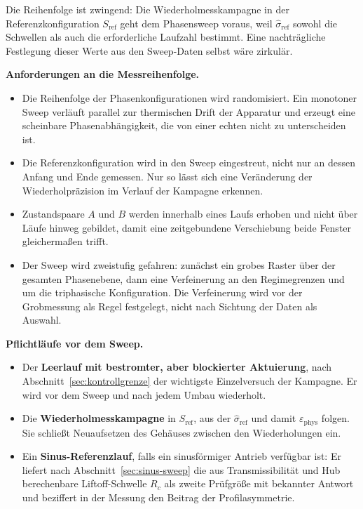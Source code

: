 \documentclass[12pt,a4paper]{report}
\begin{document}
Die Reihenfolge ist zwingend: Die Wiederholmesskampagne in der
Referenzkonfiguration $S_{\mathrm{ref}}$ geht dem Phasensweep voraus,
weil $\hat{\sigma}_{\mathrm{ref}}$ sowohl die Schwellen als auch die
erforderliche Laufzahl bestimmt. Eine nachträgliche Festlegung dieser
Werte aus den Sweep-Daten selbst wäre zirkulär.

\vspace{0.5em}

\textbf{Anforderungen an die Messreihenfolge.}

\begin{itemize}
    \item Die Reihenfolge der Phasenkonfigurationen wird randomisiert.
    Ein monotoner Sweep verläuft parallel zur thermischen Drift der
    Apparatur und erzeugt eine scheinbare Phasenabhängigkeit, die von
    einer echten nicht zu unterscheiden ist.
    \item Die Referenzkonfiguration wird in den Sweep eingestreut, nicht
    nur an dessen Anfang und Ende gemessen. Nur so lässt sich eine
    Veränderung der Wiederholpräzision im Verlauf der Kampagne erkennen.
    \item Zustandspaare $A$ und $B$ werden innerhalb eines Laufs erhoben
    und nicht über Läufe hinweg gebildet, damit eine zeitgebundene
    Verschiebung beide Fenster gleichermaßen trifft.
    \item Der Sweep wird zweistufig gefahren: zunächst ein grobes Raster
    über der gesamten Phasenebene, dann eine Verfeinerung an den
    Regimegrenzen und um die triphasische Konfiguration. Die Verfeinerung
    wird vor der Grobmessung als Regel festgelegt, nicht nach Sichtung
    der Daten als Auswahl.
\end{itemize}

\vspace{0.5em}

\textbf{Pflichtläufe vor dem Sweep.}

\begin{itemize}
    \item Der \textbf{Leerlauf mit bestromter, aber blockierter
    Aktuierung}, nach Abschnitt~\ref{sec:kontrollgrenze} der
    wichtigste Einzelversuch der Kampagne. Er wird vor dem Sweep und
    nach jedem Umbau wiederholt.
    \item Die \textbf{Wiederholmesskampagne} in $S_{\mathrm{ref}}$,
    aus der $\hat{\sigma}_{\mathrm{ref}}$ und damit
    $\varepsilon_{\mathrm{phys}}$ folgen. Sie schließt Neuaufsetzen
    des Gehäuses zwischen den Wiederholungen ein.
    \item Ein \textbf{Sinus-Referenzlauf}, falls ein sinusförmiger
    Antrieb verfügbar ist: Er liefert nach
    Abschnitt~\ref{sec:sinus-sweep} die aus Transmissibilität und Hub
    berechenbare Liftoff-Schwelle $R_c$ als zweite Prüfgröße mit
    bekannter Antwort
    und beziffert in der Messung den Beitrag der Profilasymmetrie.
\end{itemize}
\end{document}
